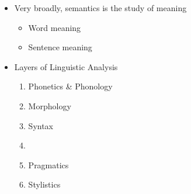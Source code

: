 \documentclass[a4paper,landscape,headrule,footrule,xetex]{foils}
\begin{document}
\begin{itemize}
\item Very broadly, semantics is the study of meaning
  \begin{itemize}
  \item Word meaning
  \item Sentence meaning
  \end{itemize}
\item Layers of Linguistic Analysis
  \begin{enumerate}%
  \item Phonetics \& Phonology
  \item Morphology
  \item Syntax
  \item {}
  \item Pragmatics
  \item Stylistics
  \end{enumerate}
\end{itemize}



\end{document}
